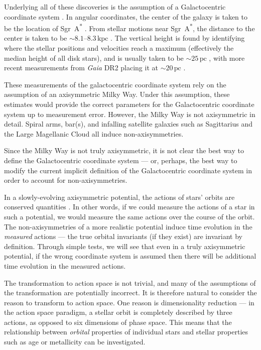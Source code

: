 \documentclass[twocolumn]{aastex62}
\newcommand{\pc}{\text{pc}}
\newcommand{\kpc}{\text{kpc}}
\begin{document}
Underlying all of these discoveries is the assumption of a Galactocentric
coordinate system \citep{2008gady.book.....B}. In angular
coordinates, the center of the galaxy is taken to be the location of
Sgr~A\textsuperscript{*} \citep[e.g.][]{2004ApJ...616..872R}. From stellar
motions near Sgr~A\textsuperscript{*}, the distance to the center is taken to
be $\sim 8.1\text{--}8.3\,\kpc$
\citep{2009ApJ...692.1075G,2018A&A...615L..15G}. The vertical height is found
by identifying where the stellar positions and velocities reach a maximum
(effectively the median height of all disk stars), and is usually taken to be
$\sim 25\,\pc$ \citep{2001ApJ...553..184C}, with more recent measurements from
{\em Gaia} DR2 placing it at $\sim 20\,\pc$ \citep{2019MNRAS.482.1417B}.

These measurements of the galactocentric coordinate system rely on the
assumption of an axisymmetric Milky Way. Under this assumption, these
estimates would provide the correct parameters for the Galactocentric
coordinate system up to measurement error. However, the Milky Way is not
axisymmetric in detail. Spiral arms, bar(s), and infalling satellite galaxies
such as Sagittarius and the Large Magellanic Cloud all induce
non-axisymmetries.

Since the Milky Way is not truly axisymmetric, it is not clear the best way to
define the Galactocentric coordinate system --- or, perhaps, the best way to
modify the current implicit definition of the Galactocentric coordinate system
in order to account for non-axisymmetries.

In a slowly-evolving axisymmetric potential, the actions of stars' orbits are
conserved quantities \citep{2008gady.book.....B,2014RvMP...86....1S}. In other
words, if we could measure the actions of a star in such a potential, we would
measure the same actions over the course of the orbit. The non-axisymmetries
of a more realistic potential induce time evolution in the {\em measured}
actions --- the true orbital invariants (if they exist) are invariant by
definition. Through simple tests, we will see that even in a truly
axisymmetric potential, if the wrong coordinate system is assumed then there
will be additional time evolution in the measured actions.

The transformation to action space is not trivial, and many of the assumptions
of the transformation are potentially incorrect. It is therefore natural to
consider the reason to transform to action space. One reason is dimensionality
reduction --- in the action space paradigm, a stellar orbit is completely
described by three actions, as opposed to six dimensions of phase space. This
means that the relationship between {\em orbital} properties of individual
stars and stellar properties such as age or metallicity can be investigated.
\end{document}
